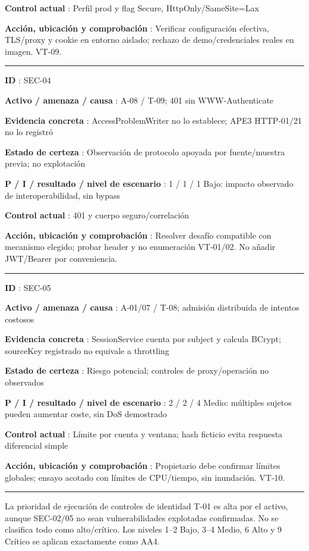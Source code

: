 \documentclass[12pt,a4paper]{report}
\begin{document}
\textbf{Control actual }: Perfil prod y flag Secure,
HttpOnly/SameSite=Lax

\textbf{Acción, ubicación y comprobación }: Verificar configuración
efectiva, TLS/proxy y cookie en entorno aislado; rechazo de
demo/credenciales reales en imagen. VT-09.

\medskip\hrule\medskip

\textbf{ID }: SEC-04

\textbf{Activo / amenaza / causa }: A-08 / T-09; 401 sin
WWW-Authenticate

\textbf{Evidencia concreta }: AccessProblemWriter no lo establece; APE3
HTTP-01/21 no lo registró

\textbf{Estado de certeza }: Observación de protocolo apoyada por
fuente/muestra previa; no explotación

\textbf{P / I / resultado / nivel de escenario }: 1 / 1 / 1 Bajo:
impacto observado de interoperabilidad, sin bypass

\textbf{Control actual }: 401 y cuerpo seguro/correlación

\textbf{Acción, ubicación y comprobación }: Resolver desafío compatible
con mecanismo elegido; probar header y no enumeración VT-01/02. No
añadir JWT/Bearer por conveniencia.

\medskip\hrule\medskip

\textbf{ID }: SEC-05

\textbf{Activo / amenaza / causa }: A-01/07 / T-08; admisión distribuida
de intentos costosos

\textbf{Evidencia concreta }: SessionService cuenta por subject y
calcula BCrypt; sourceKey registrado no equivale a throttling

\textbf{Estado de certeza }: Riesgo potencial; controles de
proxy/operación no observados

\textbf{P / I / resultado / nivel de escenario }: 2 / 2 / 4 Medio:
múltiples sujetos pueden aumentar coste, sin DoS demostrado

\textbf{Control actual }: Límite por cuenta y ventana; hash ficticio
evita respuesta diferencial simple

\textbf{Acción, ubicación y comprobación }: Propietario debe confirmar
límites globales; ensayo acotado con límites de CPU/tiempo, sin
inundación. VT-10.

\medskip\hrule\medskip

La prioridad de ejecución de controles de identidad T-01 es alta por el
activo, aunque SEC-02/05 no sean vulnerabilidades explotadas
confirmadas. No se clasifica todo como alto/crítico. Los niveles 1--2
Bajo, 3--4 Medio, 6 Alto y 9 Crítico se aplican exactamente como AA4.
\end{document}
